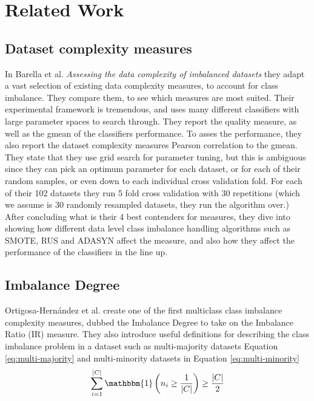 \section{Related Work}
\subsection*{Dataset complexity measures}
In Barella et al. \cite{DBLP:journals/isci/BarellaGSLC21} \emph{Assessing the data complexity of imbalanced datasets} they adapt a vast selection of existing data complexity measures, to account for class imbalance. They compare them, to see which measures are most suited.
Their experimental framework is tremendous, and uses many different classifiers with large parameter spaces to search through. They report the quality measure, as well as the gmean of the classifiers performance. To asses the performance, they also report the dataset complexity measures Pearson correlation to the gmean. They state that they use grid search for parameter tuning, but this is ambiguous since they can pick an optimum parameter for each dataset, or for each of their random samples, or even down to each individual cross validation fold. For each of their 102 datasets they run 5 fold cross validation with 30 repetitions (which we assume is 30 randomly resampled datasets, they run the algorithm over.) After concluding what is their 4 best contenders for measures, they dive into showing how different data level class imbalance handling algorithms such as SMOTE, RUS and ADASYN affect the measure, and also how they affect the performance of the classifiers in the line up. 
\subsection*{Imbalance Degree}
Ortigosa-Hernández et al. create one of the first multiclass class imbalance complexity measures, dubbed the Imbalance Degree to take on the Imbalance Ratio (IR) measure. They also introduce useful definitions for describing the class imbalance problem in a dataset such as multi-majority datasets Equation \ref{eq:multi-majority} and multi-minority datasets in Equation \ref{eq:multi-minority} 
\begin{equation}
    \label{eq:multi-majority}
\sum_{i=1}^{|C|}\mathbbm{1} \left (n_{i}\geq\frac{1}{|C|} \right )\geq\frac{|C|}{2}
\end{equation}

